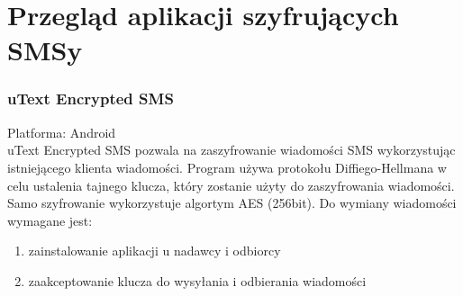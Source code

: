 \documentclass[xcolor=table]{beamer}
\begin{document}
\section{Przegląd aplikacji szyfrujących SMSy}

\begin{frame}
  \frametitle{uText Encrypted SMS}
	
	Platforma: Android\\
	uText Encrypted SMS pozwala na zaszyfrowanie wiadomości SMS 
wykorzystując istniejącego klienta wiadomości. Program używa protokołu 
	Diffiego-Hellmana w celu ustalenia tajnego klucza, który zostanie użyty 
	do zaszyfrowania wiadomości. Samo szyfrowanie wykorzystuje algortym AES (256bit).
	Do wymiany wiadomości wymagane jest:
	\begin{enumerate}
	\item zainstalowanie aplikacji u nadawcy i odbiorcy 
	\item zaakceptowanie klucza do wysyłania i odbierania wiadomości
	\end{enumerate}
	
\end{frame}
\end{document}
